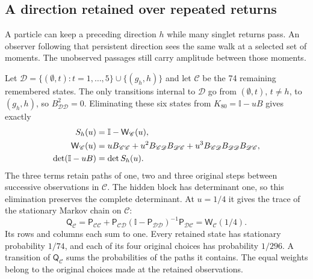 \documentclass[aps,prx,onecolumn,10pt,notitlepage,nofootinbib,longbibliography]{revtex4-2}
\numberwithin{equation}{section}
\numberwithin{table}{section}
\newcommand{\Id}{\mathbb I}
\begin{document}
\subsection{A direction retained over repeated returns}
A particle can keep a preceding direction $h$ while many singlet returns pass. An observer following that persistent direction sees the same walk at a selected set of moments. The unobserved passages still carry amplitude between those moments.

Let ${\mathscr D}=\{(\emptyset,t):t=1,\ldots,5\}\cup\{(g_h,h)\}$ and let ${\mathscr C}$ be the 74 remaining remembered states. The only transitions internal to ${\mathscr D}$ go from $(\emptyset,t)$, $t\ne h$, to $(g_h,h)$, so $B_{{\mathscr D}{\mathscr D}}^2=0$. Eliminating these six states from $K_{80}=\Id-uB$ gives exactly
\begin{align}
 S_h(u)&=\Id-\mathsf W_{\mathscr C}(u),\notag\\
 \mathsf W_{\mathscr C}(u)&=uB_{{\mathscr C}{\mathscr C}}+u^2B_{{\mathscr C}{\mathscr D}}B_{{\mathscr D}{\mathscr C}}
                 +u^3B_{{\mathscr C}{\mathscr D}}B_{{\mathscr D}{\mathscr D}}B_{{\mathscr D}{\mathscr C}},\notag\\
 \det(\Id-uB)&=\det S_h(u).
 \label{eq:retainedschur}
\end{align}
The three terms retain paths of one, two and three original steps between successive observations in ${\mathscr C}$. The hidden block has determinant one, so this elimination preserves the complete determinant. At $u=1/4$ it gives the trace of the stationary Markov chain on ${\mathscr C}$:
\begin{equation}
 \mathsf Q_{\mathscr C}=\mathsf P_{{\mathscr C}{\mathscr C}}
 +\mathsf P_{{\mathscr C}{\mathscr D}}(\Id-\mathsf P_{{\mathscr D}{\mathscr D}})^{-1}\mathsf P_{{\mathscr D}{\mathscr C}}
 =\mathsf W_{\mathscr C}(1/4).
 \label{eq:tracechain}
\end{equation}
Its rows and columns each sum to one. Every retained state has stationary probability $1/74$, and each of its four original choices has probability $1/296$. A transition of $\mathsf Q_{\mathscr C}$ sums the probabilities of the paths it contains. The equal weights belong to the original choices made at the retained observations.
\end{document}
